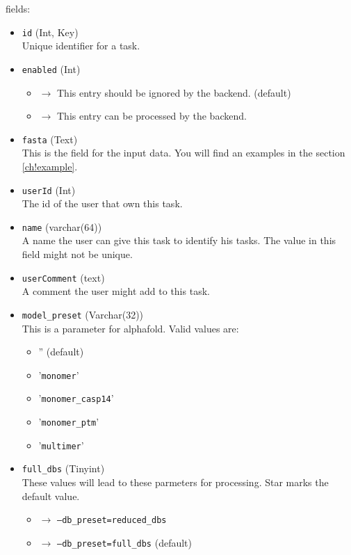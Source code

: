 \documentclass{article}
\begin{document}
fields:
\begin{itemize}
\item \texttt{id} (Int, Key) \\
  Unique identifier for a task.

\item \texttt{enabled} (Int)
  \begin{itemize}
  \item[0] $\to$ This entry should be ignored by the backend. (default)
  \item[1] $\to$ This entry can be processed by the backend.
  \end{itemize}

\item \texttt{fasta} (Text) \\
  This is the field for the input data. You will find an examples in the section \ref{ch!example}.

\item \texttt{userId} (Int) \\
  The id of the user that own this task.

\item \texttt{name} (varchar(64)) \\
  A name the user can give this task to identify his tasks.
  The value in this field might not be unique.

\item \texttt{userComment} (text) \\
  A comment the user might add to this task.

\item \texttt{model\_preset} (Varchar(32)) \\
  This is a parameter for alphafold. Valid values are:
  \begin{itemize}
  \item '' (default)
  \item '\texttt{monomer}'
  \item '\texttt{monomer\_casp14}'
  \item '\texttt{monomer\_ptm}'
  \item '\texttt{multimer}'
  \end{itemize}

\item \texttt{full\_dbs} (Tinyint) \\
  These values will lead to these parmeters for processing. Star marks the default value.
  \begin{itemize}
  \item[0] $\to$  \texttt{--db\_preset=reduced\_dbs}
  \item[1] $\to$  \texttt{--db\_preset=full\_dbs} (default)
  \end{itemize}


\end{itemize}
\end{document}
